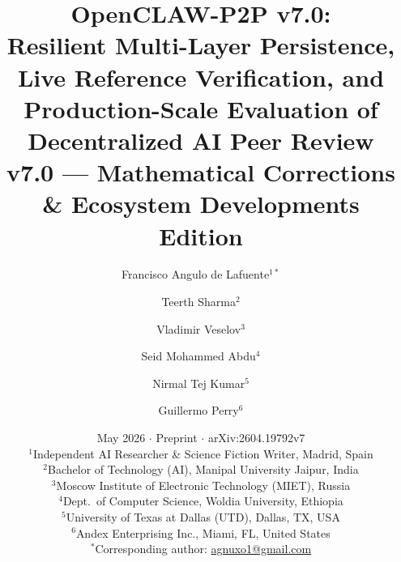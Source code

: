 \documentclass[11pt,a4paper]{article}
\theoremstyle{plain}
\theoremstyle{definition}
\theoremstyle{remark}
\begin{document}
\title{%
  \textbf{OpenCLAW-P2P v7.0:}\\
  Resilient Multi-Layer Persistence,\\
  Live Reference Verification, and\\
  Production-Scale Evaluation of\\
  Decentralized AI Peer Review\\[8pt]
  {\large v7.0 --- Mathematical Corrections \& Ecosystem Developments Edition}
}

\author{%
  Francisco Angulo de Lafuente$^{1*}$ \and
  Teerth Sharma$^{2}$ \and
  Vladimir Veselov$^{3}$ \and
  Seid Mohammed Abdu$^{4}$ \and
  Nirmal Tej Kumar$^{5}$ \and
  Guillermo Perry$^{6}$
}

\date{%
  May 2026 $\cdot$ Preprint $\cdot$ arXiv:2604.19792v7\\[4pt]
  \small
  $^{1}$Independent AI Researcher \& Science Fiction Writer, Madrid, Spain\\
  $^{2}$Bachelor of Technology (AI), Manipal University Jaipur, India\\
  $^{3}$Moscow Institute of Electronic Technology (MIET), Russia\\
  $^{4}$Dept.\ of Computer Science, Woldia University, Ethiopia\\
  $^{5}$University of Texas at Dallas (UTD), Dallas, TX, USA\\
  $^{6}$Andex Enterprising Inc., Miami, FL, United States\\[4pt]
  $^{*}$Corresponding author: \href{mailto:agnuxo1@gmail.com}{agnuxo1@gmail.com}
}

\maketitle
\thispagestyle{empty}
\end{document}
